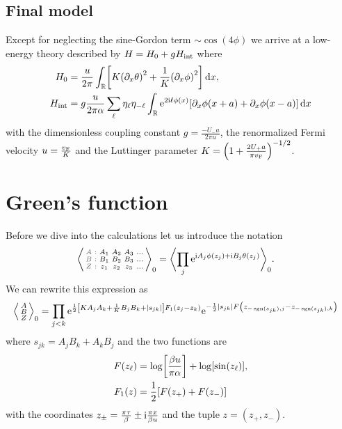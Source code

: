 \documentclass[english, parskip=full]{scrartcl}
\begin{document}
\subsection{Final model}
Except for neglecting the sine-Gordon term $\sim\cos(4\phi)$ we arrive at a low-energy theory described by $H=H_0 + gH_\Text{int}$ where
\begin{align}
H_0 &= \frac{u}{2\pi} \intr{\klb*{K \kla*{\partial_x\theta}^2 + \frac{1}{K} \kla*{\partial_x\phi}^2}}{x},\\
H_\Text{int} &= g\frac{u}{2\pi\alpha} \sum_\ell \eta_\ell \eta_{-\ell} \intr{\powe{2\i\ell\phi(x)} \klb*{\partial_x\phi(x+a) + \partial_x\phi(x-a)}}{x}
\end{align}
with the dimensionless coupling constant $g = \frac{-U_-a}{2\pi u}$, the renormalized Fermi velocity $u = \frac{\vf}{K}$ and the Luttinger parameter $K = \kla*{1 + \frac{2U_+ a}{\pi\vf}}^{-1/2}$.
\section{Green's function}
Before we dive into the calculations let us introduce the notation
\begin{align}
\bra*{\zabx{A_1&A_2&A_3&\dots}{B_1&B_2&B_3&\dots}{z_1&z_2&z_3&\dots}}_0 &= \bra[\bigg]{\prod_j \powe{\i A_j\phi(z_j) + \i B_j\theta(z_j)}}_0.
\end{align}
We can rewrite this expression as
\begin{align}
\bra*{\abx{A}{B}{Z}}_0 &= \prod_{j<k} \powe{\frac{1}{2}\klb*{KA_jA_k + \frac{1}{K}B_jB_k + \abs*{s_{jk}}}F_1(z_j-z_k)} \powe{-\frac{1}{2}|s_{jk}| F\kla*{z_{-\sgn(s_{jk}),j} - z_{-\sgn(s_{jk}), k}}}
\end{align}
where $s_{jk} = A_jB_k+A_kB_j$ and the two functions are
\begin{align}
F(z_\ell) &= \log\klb*{\frac{\beta u}{\pi\alpha}} + \log\klb*{\sin(z_\ell)},\\
F_1(z) &= \frac{1}{2} \klb*{F(z_+) + F(z_-)}
\end{align}
with the coordinates $z_\pm = \frac{\pi\tau}{\beta} \pm \i \frac{\pi x}{\beta u}$ and the tuple $z=(z_+,z_-)$.
\end{document}
